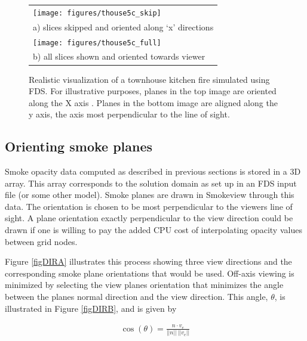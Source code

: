 \begin{figure}[\figoptions]
\begin{center}
\begin{tabular}{l}
\texttt{[image: figures/thouse5c\_skip]}\\
a) slices skipped and oriented along `x' directions\\
\texttt{[image: figures/thouse5c\_full]}\\
b) all slices shown and oriented towards viewer \\
\end{tabular}
\end{center}
\caption[Realistic visualization of a townhouse kitchen fire simulated using FDS.]{Realistic visualization of a townhouse kitchen fire simulated using FDS. For illustrative purposes, planes in the top image are oriented along the X axis .  Planes in the bottom image are aligned along the y axis, the axis most perpendicular to the line of sight.}
\label{figsmoke3d}%
\end{figure}

%
%

\subsection{Orienting smoke planes}

Smoke opacity data computed as described in previous sections is stored in a 3D array. This array corresponds to the solution domain as set up in an FDS input file (or some other model). Smoke planes are drawn in Smokeview through this data.  The orientation is chosen to be most perpendicular to the viewers line of sight. A plane orientation exactly perpendicular to the view direction could be drawn if one is willing to pay the added CPU cost of interpolating opacity values between grid nodes.

Figure \ref{figDIRA} illustrates this process showing three view directions and the corresponding smoke plane orientations that would be used. Off-axis viewing is minimized by selecting the view planes orientation that minimizes the angle between the planes normal direction and the view direction. This angle, $\theta$, is illustrated in Figure \ref{figDIRB}, and is given by

\begin{eqnarray*}
\cos(\theta)=\frac{n\cdot v_e}{||n||~||v_e||}
\end{eqnarray*}

